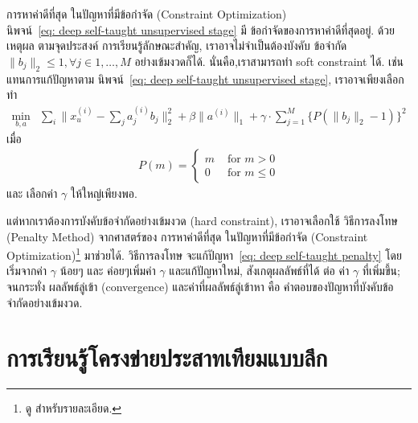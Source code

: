 \begin{minipage}{5.5in}
{\small
\begin{shaded}
การหาค่าดีที่สุด ในปัญหาที่มีข้อกำจัด (Constraint Optimization)
\\
นิพจน์~\ref{eq: deep self-taught unsupervised stage} มี ข้อกำจัดของการหาค่าดีที่สุดอยู่.
ด้วยเหตุผล ตามจุดประสงค์ การเรียนรู้ลักษณะสำคัญ, เราอาจไม่จำเป็นต้องบังคับ ข้อจำกัด
$\| b_j \|_2 \leq 1, \forall j \in 1, \ldots, M$ อย่างเข้มงวดก็ได้. นั่นคือ,เราสามารถทำ soft constraint ได้.
เช่น แทนการแก้ปัญหาตาม นิพจน์~\ref{eq: deep self-taught unsupervised stage}, เราอาจเพียงเลือกทำ
\begin{eqnarray}
  \min_{b,a} & \sum_i \| x_u^{(i)} - \sum_j a_j^{(i)} b_j \|_2^2 + \beta \| a^{(i)} \|_1
  + \gamma \cdot \sum_{j=1}^M \{ P(\| b_j \|_2 - 1) \}^2
\label{eq: deep self-taught penalty}  
\end{eqnarray} 
เมื่อ
\begin{eqnarray}
P(m) = \left\{\begin{matrix}
m & \mbox{ for } m > 0 \\
0   & \mbox{ for } m \leq 0
\end{matrix} \right.
\nonumber
\end{eqnarray}
และ เลือกค่า $\gamma$ ให้ใหญ่เพียงพอ.

แต่หากเราต้องการบังคับข้อจำกัดอย่างเข้มงวด (hard constraint), เราอาจเลือกใช้ วิธีการลงโทษ (Penalty Method)  จากศาสตร์ของ การหาค่าดีที่สุด ในปัญหาที่มีข้อกำจัด (Constraint Optimization)\footnote{
ดู \cite{ChongZak2ndEd} สำหรับรายละเอียด.}
มาช่วยได้.
วิธีการลงโทษ จะแก้ปัญหา~\ref{eq: deep self-taught penalty} โดยเริ่มจากค่า $\gamma$ น้อยๆ และ ค่อยๆเพิ่มค่า $\gamma$ และแก้ปัญหาใหม่, สังเกตุผลลัพธ์ที่ได้ ต่อ ค่า $\gamma$ ที่เพิ่มขึ้น;
จนกระทั่ง ผลลัพธ์ลู่เข้า (convergence) และค่าที่ผลลัพธ์ลู่เข้าหา คือ คำตอบของปัญหาที่บังคับข้อจำกัดอย่างเข้มงวด.
\end{shaded}
}
\end{minipage}

\section{การเรียนรู้โครงข่ายประสาทเทียมแบบลึก}
\label{deep learning: deep neural networks}

